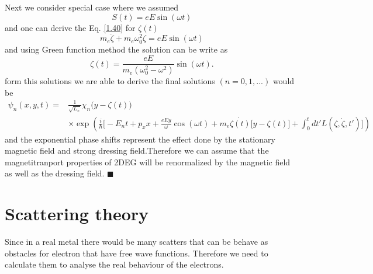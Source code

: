 \documentclass[a4paper]{article}
\numberwithin{equation}{subsection}
\numberwithin{equation}{section}
\begin{document}
\noindent
Next we consider special case where we assumed
\begin{equation} \label{1.49}
  S(t) = eE\sin(\omega t)
\end{equation}
and one can derive the Eq. \eqref{1.40} for $\zeta(t)$
\begin{equation} \label{1.50}
  m_e\ddot{\zeta} + m_e\omega_0^2\zeta = eE\sin(\omega t)
\end{equation}
and using Green function method the solution can be write as
\begin{equation} \label{1.51}
  \zeta(t) = \frac{eE}{m_e(\omega_0^2 - \omega^2)}\sin(\omega t).
\end{equation}
form this solutions we are able to derive the final solutions $(n=0,1,...)$ would be
\begin{equation} \label{1.52}
  \begin{aligned}
    \psi_n(x,y,t)  = & \frac{1}{\sqrt{L_x}} \chi_n\big(y - \zeta(t)\big) \\
    & \times
      \exp(
     \frac{i}{\hbar}\bigg[- E_nt +
    p_x x +
    \frac{eEy}{\omega}\cos(\omega t)+
    m_e\dot{\zeta(t)}\big[y-\zeta(t)\big]
     + \int_0^{t}dt'L(\zeta,\dot{\zeta},t')\bigg])
  \end{aligned}
\end{equation}
and the exponential phase shifts represent the effect done by the stationary magnetic field and strong dressing field.Therefore we can assume that the magnetitranport properties of 2DEG will be renormalized by the magnetic field as well as the dressing field.
\hfill$\blacksquare$

\section{Scattering theory}

Since in a real metal there would be many scatters that can be behave as obstacles for electron that have free wave functions. Therefore we need to calculate them to analyse the real behaviour of the electrons.
\end{document}
